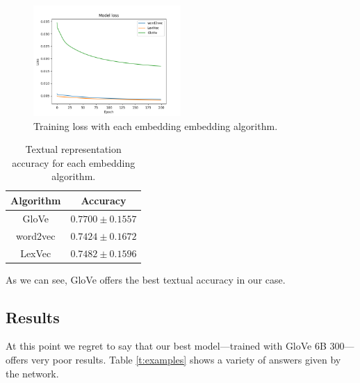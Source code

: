\documentclass[]{article}
\begin{document}
	\begin{figure}[H]
		\centering
		\includegraphics[width=0.5\textwidth]{sources}
		\caption{Training loss with each embedding embedding algorithm.}
		\label{f:sources}
	\end{figure}
	
	\begin{table}[H]
		\centering
		\begin{tabular}{@{}cc@{}}
			\toprule
			Algorithm & Accuracy            \\ \midrule
			GloVe     & $0.7700 \pm 0.1557$ \\
			word2vec  & $0.7424 \pm 0.1672$ \\
			LexVec    & $0.7482 \pm 0.1596$ \\ \bottomrule
		\end{tabular}
		\caption{Textual representation accuracy for each embedding algorithm.}
		\label{t:sources}
	\end{table}
	
	As we can see, GloVe offers the best textual accuracy in our case.
	
	\subsection{Results}
	
	At this point we regret to say that our best model---trained with GloVe 6B 300---offers very poor results. Table \ref{t:examples} shows a variety of answers given by the network.
	
\end{document}
